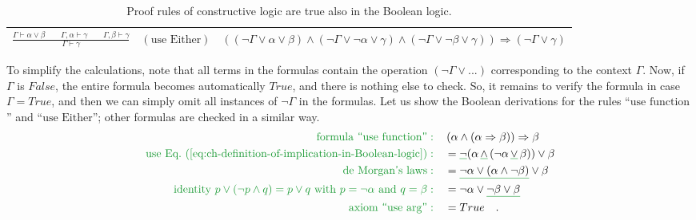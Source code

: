 \begin{table}
\begin{centering}
\begin{tabular}{|c|c|}
\hline 
{\small{}$\frac{\Gamma\vdash\alpha\vee\beta\quad\quad\Gamma,\alpha\vdash\gamma\quad\quad\Gamma,\beta\vdash\gamma}{\Gamma\vdash\gamma}\quad(\text{use Either})$} & {\small{}$\left(\left(\neg\Gamma\vee\alpha\vee\beta\right)\wedge\left(\neg\Gamma\vee\neg\alpha\vee\gamma\right)\wedge\left(\neg\Gamma\vee\neg\beta\vee\gamma\right)\right)\Rightarrow\left(\neg\Gamma\vee\gamma\right)$}\tabularnewline
\hline 
\end{tabular}
\par\end{centering}
\caption{Proof rules of constructive logic are true also in the Boolean logic.\label{tab:Proof-rules-of-constructive-and-boolean}}
\end{table}

To simplify the calculations, note that all terms in the formulas
contain the operation $\left(\neg\Gamma\vee...\right)$ corresponding
to the context $\Gamma$. Now, if $\Gamma$ is $False$, the entire
formula becomes automatically $True$, and there is nothing else to
check. So, it remains to verify the formula in case $\Gamma=True$,
and then we can simply omit all instances of $\neg\Gamma$ in the
formulas. Let us show the Boolean derivations for the rules \textsf{``}$\text{use function}$\textsf{''}
and \textsf{``}$\text{use Either}$\textsf{''}; other formulas are checked in a similar
way. 
\begin{align*}
{\color{greenunder}\text{formula \textsf{``}use function\textsf{''}}:}\quad & \left(\alpha\wedge\left(\alpha\Rightarrow\beta\right)\right)\Rightarrow\beta\\
{\color{greenunder}\text{use Eq.~(\ref{eq:ch-definition-of-implication-in-Boolean-logic})}:}\quad & =\gunderline{\neg}(\alpha\,\gunderline{\wedge}\,(\neg\alpha\,\gunderline{\vee}\,\beta))\vee\beta\\
{\color{greenunder}\text{de Morgan\textsf{'}s laws}:}\quad & =\gunderline{\neg\alpha\vee(\alpha\wedge\neg\beta)}\vee\beta\\
{\color{greenunder}\text{identity }p\vee(\neg p\wedge q)=p\vee q\text{ with }p=\neg\alpha\text{ and }q=\beta:}\quad & =\neg\alpha\vee\gunderline{\neg\beta\vee\beta}\\
{\color{greenunder}\text{axiom \textsf{``}use arg\textsf{''}}:}\quad & =True\quad.
\end{align*}
